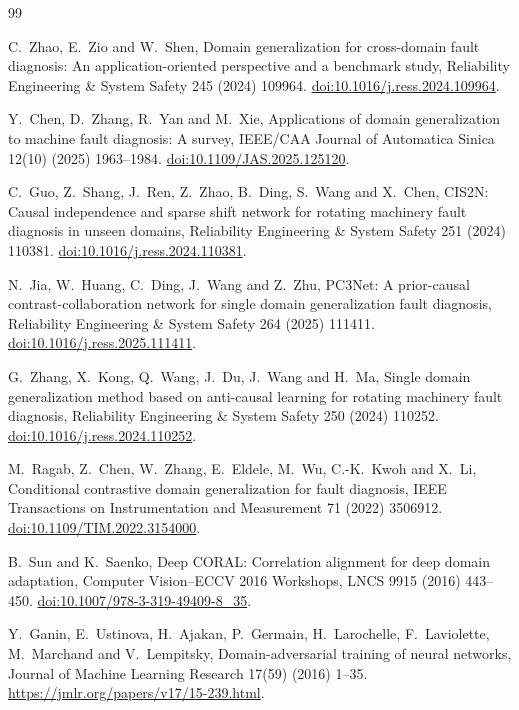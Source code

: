 \begin{thebibliography}{99}

C.~Zhao, E.~Zio and W.~Shen,
Domain generalization for cross-domain fault diagnosis: An application-oriented
perspective and a benchmark study,
Reliability Engineering \& System Safety 245 (2024) 109964.
\href{https://doi.org/10.1016/j.ress.2024.109964}{doi:10.1016/j.ress.2024.109964}.

Y.~Chen, D.~Zhang, R.~Yan and M.~Xie,
Applications of domain generalization to machine fault diagnosis: A survey,
IEEE/CAA Journal of Automatica Sinica 12(10) (2025) 1963--1984.
\href{https://doi.org/10.1109/JAS.2025.125120}{doi:10.1109/JAS.2025.125120}.

C.~Guo, Z.~Shang, J.~Ren, Z.~Zhao, B.~Ding, S.~Wang and X.~Chen,
CIS2N: Causal independence and sparse shift network for rotating machinery fault diagnosis in unseen domains,
Reliability Engineering \& System Safety 251 (2024) 110381.
\href{https://doi.org/10.1016/j.ress.2024.110381}{doi:10.1016/j.ress.2024.110381}.

N.~Jia, W.~Huang, C.~Ding, J.~Wang and Z.~Zhu,
PC3Net: A prior-causal contrast-collaboration network for single domain
generalization fault diagnosis,
Reliability Engineering \& System Safety 264 (2025) 111411.
\href{https://doi.org/10.1016/j.ress.2025.111411}{doi:10.1016/j.ress.2025.111411}.

G.~Zhang, X.~Kong, Q.~Wang, J.~Du, J.~Wang and H.~Ma,
Single domain generalization method based on anti-causal learning for rotating machinery fault diagnosis,
Reliability Engineering \& System Safety 250 (2024) 110252.
\href{https://doi.org/10.1016/j.ress.2024.110252}{doi:10.1016/j.ress.2024.110252}.

M.~Ragab, Z.~Chen, W.~Zhang, E.~Eldele, M.~Wu, C.-K.~Kwoh and X.~Li,
Conditional contrastive domain generalization for fault diagnosis,
IEEE Transactions on Instrumentation and Measurement 71 (2022) 3506912.
\href{https://doi.org/10.1109/TIM.2022.3154000}{doi:10.1109/TIM.2022.3154000}.

B.~Sun and K.~Saenko,
Deep CORAL: Correlation alignment for deep domain adaptation,
Computer Vision--ECCV 2016 Workshops, LNCS 9915 (2016) 443--450.
\href{https://doi.org/10.1007/978-3-319-49409-8_35}{doi:10.1007/978-3-319-49409-8\_35}.

Y.~Ganin, E.~Ustinova, H.~Ajakan, P.~Germain, H.~Larochelle, F.~Laviolette, M.~Marchand and V.~Lempitsky,
Domain-adversarial training of neural networks,
Journal of Machine Learning Research 17(59) (2016) 1--35.
\url{https://jmlr.org/papers/v17/15-239.html}.


\end{thebibliography}
